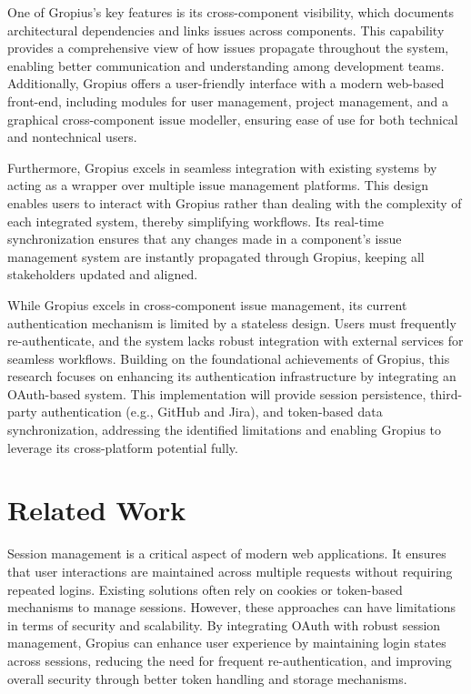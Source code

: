 One of Gropius’s key features is its cross-component visibility, which documents architectural dependencies and links issues across components. This capability provides a comprehensive view of how issues propagate throughout the system, enabling better communication and understanding among development teams. Additionally, Gropius offers a user-friendly interface with a modern web-based front-end, including modules for user management, project management, and a graphical cross-component issue modeller, ensuring ease of use for both technical and nontechnical users.

Furthermore, Gropius excels in seamless integration with existing systems by acting as a wrapper over multiple issue management platforms. This design enables users to interact with Gropius rather than dealing with the complexity of each integrated system, thereby simplifying workflows. Its real-time synchronization ensures that any changes made in a component’s issue management system are instantly propagated through Gropius, keeping all stakeholders updated and aligned.

While Gropius excels in cross-component issue management, its current authentication mechanism is limited by a stateless design. Users must frequently re-authenticate, and the system lacks robust integration with external services for seamless workflows. Building on the foundational achievements of Gropius, this research focuses on enhancing its authentication infrastructure by integrating an OAuth-based system. This implementation will provide session persistence, third-party authentication (e.g., GitHub and Jira), and token-based data synchronization, addressing the identified limitations and enabling Gropius to leverage its cross-platform potential fully.
\section{Related Work}
Session management is a critical aspect of modern web applications. It ensures that user interactions are maintained across multiple requests without requiring repeated logins.
Existing solutions often rely on cookies or token-based mechanisms to manage sessions.
However, these approaches can have limitations in terms of security and scalability.
By integrating OAuth with robust session management, Gropius can enhance user experience by maintaining login states across sessions, reducing the need for frequent re-authentication,
and improving overall security through better token handling and storage mechanisms.


